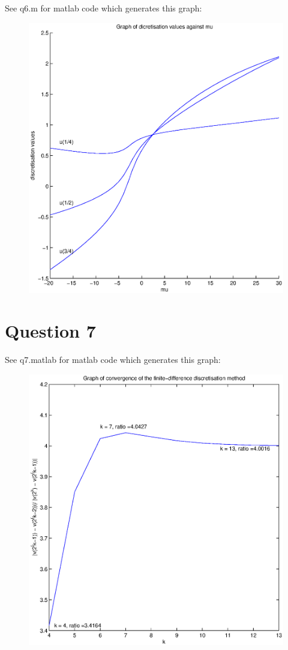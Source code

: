 \documentclass[fleqn]{report}
\begin{document}
See q6.m for matlab code which generates this graph:
\begin{figure}[h!]
\begin{center}
    \centerline{\includegraphics[width=1.0\textwidth]{graphs/q6.eps}}
\end{center}
\end{figure}

\newpage
\section{Question 7}
See q7.matlab for matlab code which generates this graph:
\begin{figure}[h!]
\begin{center}
    \centerline{\includegraphics[width=1.0\textwidth]{graphs/q7.eps}}
\end{center}
\end{figure}
\end{document}
